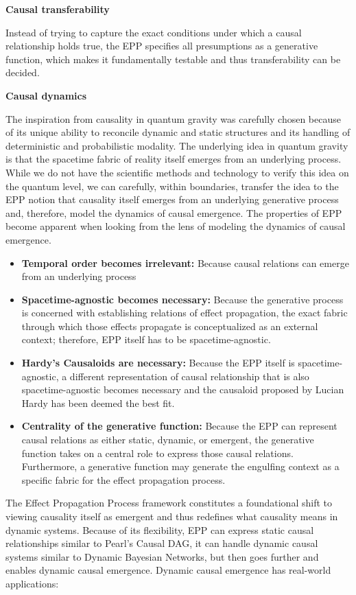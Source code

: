 \documentclass{article}
\begin{document}
\textbf{Causal transferability}

Instead of trying to capture the exact conditions under which a causal relationship holds true, the EPP specifies all presumptions as a generative function, which makes it fundamentally testable and thus transferability can be decided.

\textbf{Causal dynamics}

The inspiration from causality in quantum gravity was carefully chosen because of its unique ability to reconcile dynamic and static structures and its handling of deterministic and probabilistic modality. The underlying idea in quantum gravity is that the spacetime fabric of reality itself emerges from an underlying process. While we do not have the scientific methods and technology to verify this idea on the quantum level, we can carefully, within boundaries, transfer the idea to the EPP notion that causality itself emerges from an underlying generative process and, therefore, model the dynamics of causal emergence. The properties of EPP become apparent when looking from the lens of modeling the dynamics of causal emergence.

\begin{itemize}
    \item \textbf{Temporal order becomes irrelevant:} Because causal relations can emerge from an underlying process
    \item \textbf{Spacetime-agnostic becomes necessary:} Because the generative process is concerned with establishing relations of effect propagation, the exact fabric through which those effects propagate is conceptualized as an external context; therefore, EPP itself has to be spacetime-agnostic.
    \item \textbf{Hardy's Causaloids are necessary:} Because the EPP itself is spacetime-agnostic, a different representation of causal relationship that is also spacetime-agnostic becomes necessary and the causaloid proposed by Lucian Hardy has been deemed the best fit.
    \item \textbf{Centrality of the generative function:} Because the EPP can represent causal relations as either static, dynamic, or emergent, the generative function takes on a central role to express those causal relations. Furthermore, a generative function may generate the engulfing context as a specific fabric for the effect propagation process.
\end{itemize}


The Effect Propagation Process framework constitutes a  foundational shift to viewing causality itself as emergent and thus redefines what causality means in dynamic systems. Because of its flexibility, EPP can express static causal relationships similar to Pearl’s Causal DAG, it can handle dynamic causal systems similar to Dynamic Bayesian Networks, but then goes further and enables dynamic causal emergence. Dynamic causal emergence has real-world applications:
\end{document}
